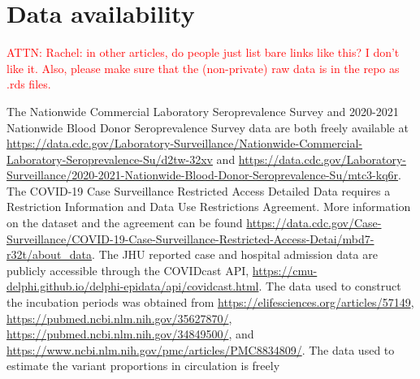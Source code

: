 \documentclass{article}
\newcommand{\attn }[1]{\textcolor{red}{ATTN: #1}}
\begin{document}









\section*{Data availability}

\attn{Rachel: in other articles, do people just list bare links like this? I don't like it. Also, please make sure that the (non-private) raw data is in the repo as .rds files.}

The Nationwide Commercial Laboratory Seroprevalence Survey 
and 2020-2021 Nationwide Blood Donor Seroprevalence Survey 
data are both freely available at
\href{https://data.cdc.gov/Laboratory-Surveillance/Nationwide-Commercial-Laboratory-Seroprevalence-Su/d2tw-32xv}{https://data.cdc.gov/Laboratory-Surveillance/Nationwide-Commercial-Laboratory-Seroprevalence-Su/d2tw-32xv} 
and 
\href{https://data.cdc.gov/Laboratory-Surveillance/2020-2021-Nationwide-Blood-Donor-Seroprevalence-Su/mtc3-kq6r}{https://data.cdc.gov/Laboratory-Surveillance/2020-2021-Nationwide-Blood-Donor-Seroprevalence-Su/mtc3-kq6r}. 
The COVID-19 Case Surveillance Restricted Access Detailed Data 
requires a Restriction Information and Data Use Restrictions 
Agreement. More information on the dataset and the agreement 
can be found \href{https://data.cdc.gov/Case-Surveillance/COVID-19-Case-Surveillance-Restricted-Access-Detai/mbd7-r32t/about\_data}{https://data.cdc.gov/Case-Surveillance/COVID-19-Case-Surveillance-Restricted-Access-Detai/mbd7-r32t/about\_data}. 
The JHU reported case and hospital admission data are 
publicly accessible through the COVIDcast API, 
\href{https://cmu-delphi.github.io/delphi-epidata/api/covidcast.html}{https://cmu-delphi.github.io/delphi-epidata/api/covidcast.html}. 
The data used to construct the incubation periods was obtained from \newline
\href{https://elifesciences.org/articles/57149}{https://elifesciences.org/articles/57149}, 
\href{https://pubmed.ncbi.nlm.nih.gov/35627870/}{https://pubmed.ncbi.nlm.nih.gov/35627870/}, \newline
\href{https://pubmed.ncbi.nlm.nih.gov/34849500/}{https://pubmed.ncbi.nlm.nih.gov/34849500/}, 
and \href{https://www.ncbi.nlm.nih.gov/pmc/articles/PMC8834809/}{https://www.ncbi.nlm.nih.gov/pmc/articles/PMC8834809/}. 
The data used to estimate the variant proportions in circulation is freely 
\end{document}
